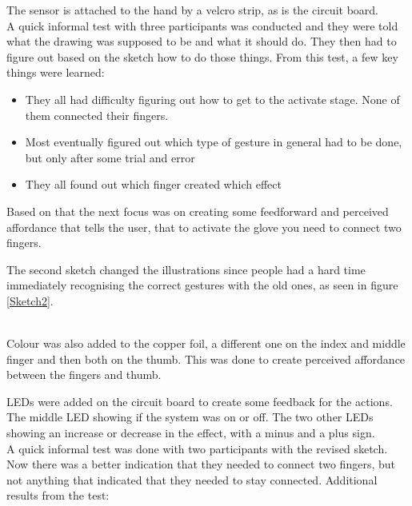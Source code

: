 The sensor is attached to the hand by a velcro strip, as is the circuit board. \\

A quick informal test with three participants was conducted and they were told what the drawing was supposed to be and what it should do. They then had to figure out based on the sketch how to do those things.
From this test, a few key things were learned:
 
\begin{itemize}
	\item They all had difficulty figuring out how to get to the activate stage. None of them connected their fingers.
	\item Most eventually figured out which type of gesture in general had to be done, but only after some trial and error
	\item They all found out which finger created which effect
\end{itemize}

Based on that the next focus was on creating some feedforward and perceived affordance that tells the user, that to activate the glove you need to connect two fingers.

The second sketch changed the illustrations since people had a hard time immediately recognising the correct gestures with the old ones, as seen in figure \ref{Sketch2}.\\

\begin{minipage}{\linewidth}%
\label{Sketch2}
\end{minipage}\\

Colour was also added to the copper foil, a different one on the index and middle finger and then both on the thumb. This was done to create perceived affordance between the fingers and thumb.

LEDs were added on the circuit board to create some feedback for the actions. The middle LED showing if the system was on or off. The two other LEDs showing an increase or decrease in the effect, with a minus and a plus sign.\\

A quick informal test was done with two participants with the revised sketch. Now there was a better indication that they needed to connect two fingers, but not anything that indicated that they needed to stay connected.
Additional results from the test:

